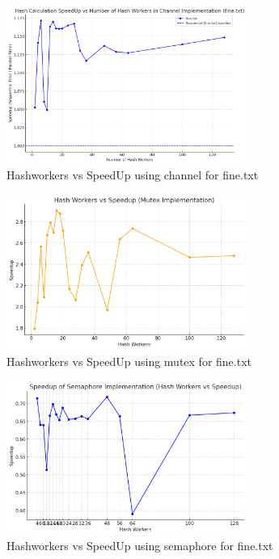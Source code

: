\documentclass[letterpaper,12pt]{article}
\theoremstyle{remark}
\begin{document}
\begin{figure}[ht]
    \centering
    \includegraphics[width=0.7\textwidth]{hashworkerFine.png}
    \caption{Hashworkers vs SpeedUp  using channel for fine.txt}
    \label{fig:Hashworkers vs SpeedUp}
\end{figure}

\begin{figure}[ht]
    \centering
    \includegraphics[width=0.7\textwidth]{hashworkerMutexFine.png}
    \caption{Hashworkers vs SpeedUp  using mutex for fine.txt}
    \label{fig:Hashworkers vs SpeedUp}
\end{figure}


\begin{figure}[ht]
    \centering
    \includegraphics[width=0.7\textwidth]{hashworkerSemaphoreFine.png}
    \caption{Hashworkers vs SpeedUp  using semaphore for fine.txt}
    \label{fig:Hashworkers vs SpeedUp}
\end{figure}
\end{document}
